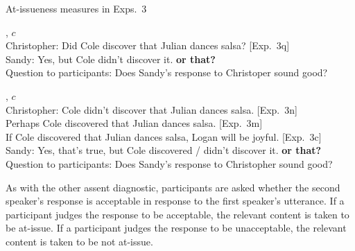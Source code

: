 \documentclass[11pt,fleqn]{article}
\newcommand{\6}{\mbox{$[\hspace*{-.6mm}[$}}
\newcommand{\9}{\mbox{$]\hspace*{-.6mm}]$}}
\begin{document}
\begin{exe}
\ex\label{ai-exps3} At-issueness measures in Exps.~3
\begin{xlist}
, $c$
\\ Christopher: Did Cole discover that Julian dances salsa? \hfill [Exp.~3q]
\\ Sandy: Yes, but Cole didn't discover it. {\bf or that?}
\\ Question to participants: Does Sandy's response to Christoper sound good?

, $c$
\\ Christopher: Cole didn't discover that Julian dances salsa.  \hfill [Exp.~3n]
\\ \hspace*{2cm} Perhaps Cole discovered that Julian dances salsa.  \hfill [Exp.~3m]
\\ \hspace*{2cm} If Cole discovered that Julian dances salsa, Logan will be joyful.  \hfill [Exp.~3c]
\\ Sandy: Yes, that's true, but Cole discovered / didn't discover it. {\bf or that?}
\\ Question to participants: Does Sandy's response to Christopher sound good?

\end{xlist}
\end{exe}
As with the other assent diagnostic, participants are asked whether the second speaker's response is acceptable in response to the first speaker's utterance. If a participant judges the response to be acceptable, the relevant content is taken to be at-issue. If a participant judges the response to be unacceptable, the relevant content is taken to be not at-issue.
\end{document}

